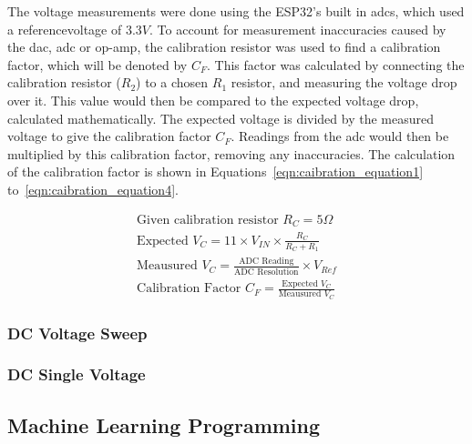 The voltage measurements were done using the ESP32's built in \gls{adc}s, which used a referencevoltage of $3.3V$.
To account for measurement inaccuracies caused by the \gls{dac}, \gls{adc} or op-amp, the calibration resistor was used to find a calibration factor, which will be denoted by $C_F$.
This factor was calculated by connecting the calibration resistor ($R_2$) to a chosen $R_1$ resistor, and measuring the voltage drop over it.
This value would then be compared to the expected voltage drop, calculated mathematically.
The expected voltage is divided by the measured voltage to give the calibration factor $C_F$.
Readings from the \gls{adc} would then be multiplied by this calibration factor, removing any inaccuracies.
The calculation of the calibration factor is shown in Equations~\ref{eqn:caibration_equation1} to~\ref{eqn:caibration_equation4}.

\begin{gather}
    \text{Given calibration resistor }R_{C} = 5\Omega \label{eqn:caibration_equation1} \\
    \text{Expected }V_{C} = 11\times V_{IN}\times\frac{R_C}{R_C+R_1} \\
    \text{Meausured }V_{C} = \frac{\text{ADC Reading}}{\text{ADC Resolution}} \times V_{Ref} \\
    \text{Calibration Factor }C_F = \frac{\text{Expected }V_C}{\text{Meausured }V_C} \label{eqn:caibration_equation4}
\end{gather}

\subsubsection{DC Voltage Sweep}

\subsubsection{DC Single Voltage}

\subsection{Machine Learning Programming}

